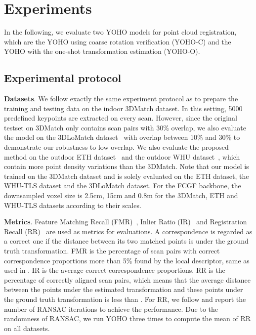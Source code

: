 
\section{Experiments}
In the following, we evaluate two YOHO models for point cloud registration, which are the YOHO using coarse rotation verification (YOHO-C) and the YOHO with the one-shot transformation estimation (YOHO-O).

\subsection{Experimental protocol}

\textbf{Datasets}. We follow exactly the same experiment protocol as \cite{3dmatch} to prepare the training and testing data on the indoor 3DMatch dataset. In this setting, 5000 predefined keypoints are extracted on every scan. 
However, since the original testset on 3DMatch only contains scan pairs with 30\% overlap, we also evaluate the model on the 3DLoMatch dataset~\cite{predator} with overlap between 10\% and 30\% to demonstrate our robustness to low overlap. 
We also evaluate the proposed method on the outdoor ETH dataset~\cite{smooth} and the outdoor WHU dataset~\cite{dong2020registration}, which contain more point density variations than the 3DMatch. Note that our model is trained on the 3DMatch dataset and is solely evaluated on the ETH dataset, the WHU-TLS dataset and the 3DLoMatch dataset. 
For the FCGF backbone, the downsampled voxel size is 2.5cm, 15cm and 0.8m for the 3DMatch, ETH and WHU-TLS datasets according to their scales.

\textbf{Metrics}. Feature Matching Recall (FMR)~\cite{smooth,FCGF,predator}, Inlier Ratio (IR)~\cite{predator} and Registration Recall (RR)~\cite{FCGF,d3feat,predator} are used as metrics for evaluations. A correspondence is regarded as a correct one if the distance between its two matched points is  under the ground truth transformation. FMR is the percentage of scan pairs with correct correspondence proportions more than 5\% found by the local descriptor, same as used in \cite{ao2020spinnet,predator}. IR is the average correct correspondence proportions. RR is the percentage of correctly aligned scan pairs, which means that the average distance between the points under the estimated transformation and these points under the ground truth transformation is less than . 
For RR, we follow \cite{predator} and report the number of RANSAC iterations to achieve the performance. Due to the randomness of RANSAC, we run YOHO three times to compute the mean of RR on all datasets.

